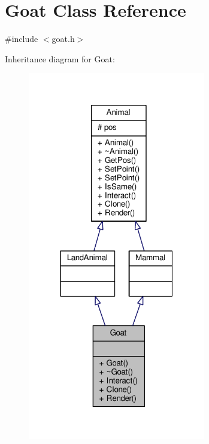 \hypertarget{classGoat}{}\section{Goat Class Reference}
\label{classGoat}


{\ttfamily \#include $<$goat.\+h$>$}



Inheritance diagram for Goat\+:
\nopagebreak
\begin{figure}[H]
\begin{center}
\leavevmode
\includegraphics[width=220pt]{classGoat__inherit__graph}
\end{center}
\end{figure}


